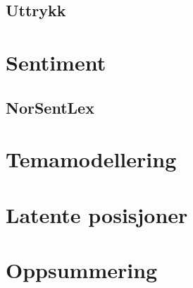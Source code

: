 \documentclass[
]{article}
\begin{document}
\hypertarget{uttrykk}{%
\subsection{Uttrykk}\label{uttrykk}}

\hypertarget{sentiment}{%
\section{Sentiment}\label{sentiment}}

\hypertarget{norsentlex}{%
\subsection{NorSentLex}\label{norsentlex}}

\hypertarget{topicmod}{%
\section{Temamodellering}\label{topicmod}}

\hypertarget{posisjon}{%
\section{Latente posisjoner}\label{posisjon}}

\hypertarget{oppsummering}{%
\section*{Oppsummering}\label{oppsummering}}
\end{document}
